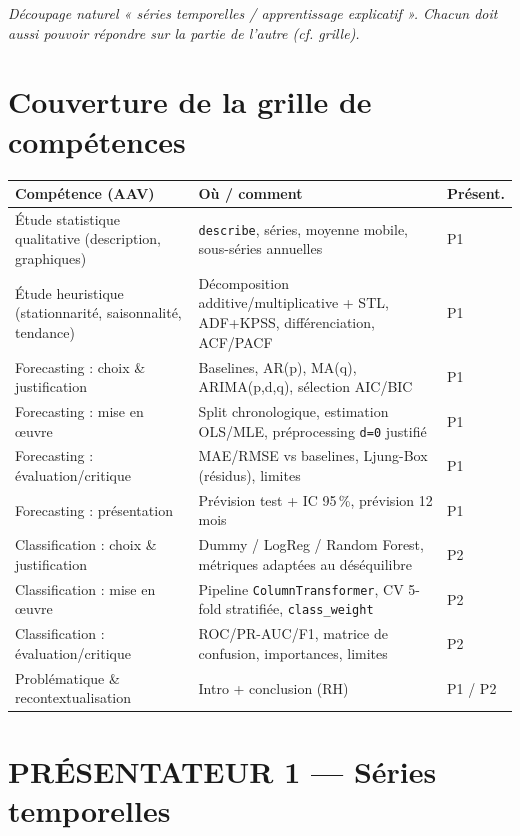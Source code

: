 \documentclass[11pt,a4paper]{article}
\newcommand{\code}[1]{\texttt{#1}}
\begin{document}
\noindent\emph{Découpage naturel « séries temporelles / apprentissage explicatif ». Chacun doit
aussi pouvoir répondre sur la partie de l'autre (cf. grille).}

\section{Couverture de la grille de compétences}

\begin{center}
\begin{tabular}{@{}p{5.2cm}p{6.4cm}p{2.4cm}@{}}
\toprule
\textbf{Compétence (AAV)} & \textbf{Où / comment} & \textbf{Présent.} \\
\midrule
Étude statistique qualitative (description, graphiques) & \code{describe}, séries, moyenne mobile, sous-séries annuelles & P1 \\
Étude heuristique (stationnarité, saisonnalité, tendance) & Décomposition additive/multiplicative + STL, ADF+KPSS, différenciation, ACF/PACF & P1 \\
Forecasting : choix \& justification & Baselines, AR(p), MA(q), ARIMA(p,d,q), sélection AIC/BIC & P1 \\
Forecasting : mise en œuvre & Split chronologique, estimation OLS/MLE, préprocessing \code{d=0} justifié & P1 \\
Forecasting : évaluation/critique & MAE/RMSE vs baselines, Ljung-Box (résidus), limites & P1 \\
Forecasting : présentation & Prévision test + IC 95\,\%, prévision 12 mois & P1 \\
Classification : choix \& justification & Dummy / LogReg / Random Forest, métriques adaptées au déséquilibre & P2 \\
Classification : mise en œuvre & Pipeline \code{ColumnTransformer}, CV 5-fold stratifiée, \code{class\_weight} & P2 \\
Classification : évaluation/critique & ROC/PR-AUC/F1, matrice de confusion, importances, limites & P2 \\
Problématique \& recontextualisation & Intro + conclusion (RH) & P1 / P2 \\
\bottomrule
\end{tabular}
\end{center}

\section*{\textcolor{blue!50!black}{PRÉSENTATEUR 1 --- Séries temporelles}}
\end{document}
